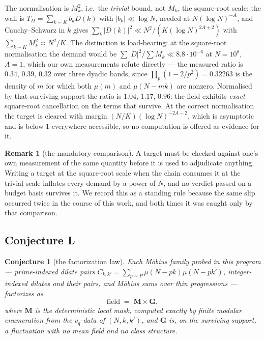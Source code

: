 \documentclass[11pt,a4paper]{article}
\theoremstyle{plain}
\newtheorem{conjecture}[theorem]{Conjecture}
\theoremstyle{definition}
\newtheorem{remark}[theorem]{Remark}
\begin{document}
The normalisation is $M_k^2$, i.e.\ the \emph{trivial} bound, not
$M_k$, the square-root scale: the wall is
$T_{II} = \sum_{k\sim K}b_kD(k)$ with $|b_k|\ll\log N$, needed at
$N(\log N)^{-A}$, and Cauchy--Schwarz in $k$ gives
$\sum_k|D(k)|^2 \ll N^2/(K(\log N)^{2A+2})$ with
$\sum_{k\sim K}M_k^2 \asymp N^2/K$. The distinction is load-bearing:
at the square-root normalisation the demand would be
$\sum|D|^2/\sum M_k \ll 8.8\cdot10^{-6}$ at $N=10^8$, $A=1$, which our
own measurements refute directly --- the measured ratio is
$0.34,\,0.39,\,0.32$ over three dyadic bands, since
$\prod_p(1-2/p^2) = 0.32263$ is the density of $m$ for which both
$\mu(m)$ and $\mu(N-mk)$ are nonzero. Normalised by that surviving
support the ratio is $1.04,\,1.17,\,0.96$: the field exhibits
\emph{exact} square-root cancellation on the terms that survive. At the
correct normalisation the target is cleared with margin
$(N/K)(\log N)^{-2A-2}$, which is asymptotic and is below $1$
everywhere accessible, so no computation is offered as evidence for it.

\begin{remark}[the mandatory comparison]\label{rem:scale}
A target must be checked against one's own measurement of the same
quantity before it is used to adjudicate anything. Writing a target at
the square-root scale when the chain consumes it at the trivial scale
inflates every demand by a power of $N$, and no verdict passed on a
budget basis survives it. We record this as a standing rule because
the same slip occurred twice in the course of this work, and both times
it was caught only by that comparison.
\end{remark}

\subsection{Conjecture L}

\begin{conjecture}[the factorization law]\label{conj:L}
Each M\"obius family probed in this program --- prime-indexed dilate
pairs $C_{k,k'} = \sum_{p\sim P}\mu(N-pk)\mu(N-pk')$, integer-indexed
dilates and their pairs, and M\"obius sums over thin progressions ---
factorizes as
\[
  \text{field} \;=\; \mathbf M \times \mathbf G,
\]
where $\mathbf M$ is the deterministic local mask, computed exactly by
finite modular enumeration from the $v_q$-data of $(N,k,k')$, and
$\mathbf G$ is, on the surviving support, a fluctuation with no mean
field and no class structure.
\end{conjecture}
\end{document}
